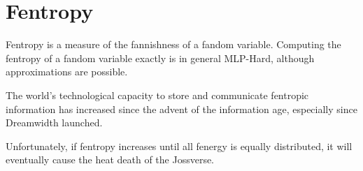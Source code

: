 \documentclass[9pt]{sigplanconf}
\begin{document}
\section{Fentropy}

Fentropy is a measure of the fannishness of a fandom variable. Computing the
fentropy of a fandom variable exactly is in general MLP-Hard, although
approximations are possible.

The world's technological capacity to store and communicate fentropic
information has increased since the advent of the information age,
especially since Dreamwidth launched.

Unfortunately, if fentropy increases until all fenergy is equally
distributed, it will eventually cause the heat death of the Jossverse.



\end{document}

